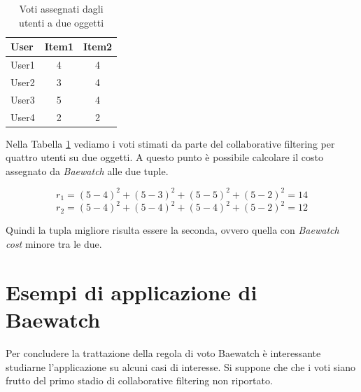 \documentclass[letterpaper]{article}
\begin{document}
\begin{table}[h]
\centering
\begin{tabular}{|l|c|c|}
\hline
\textbf{User} & \multicolumn{1}{l|}{\textbf{Item1}} & \multicolumn{1}{l|}{\textbf{Item2}} \\ \hline
User1         & 4                                   & 4                                   \\ \hline
User2         & 3                                   & 4                                   \\ \hline
User3         & 5                                   & 4                                   \\ \hline
User4         & 2                                   & 2                                   \\ \hline
\end{tabular}
\caption{Voti assegnati dagli utenti a due oggetti}
\label{table:1}
\end{table}

Nella Tabella \ref{table:1} vediamo i voti stimati da parte del collaborative filtering per quattro utenti su due oggetti. A questo punto è possibile calcolare il costo assegnato da \emph{Baewatch} alle due tuple.

\begin{equation}
    r_1 = (5 - 4)^2 + (5 - 3)^2 + (5 - 5)^2 + (5 - 2) ^2 = 14
\end{equation}
\begin{equation}
    r_2 = (5 - 4)^2 + (5 - 4)^2 + (5 - 4)^2 + (5 - 2) ^2 = 12
\end{equation}

Quindi la tupla migliore risulta essere la seconda, ovvero quella con \emph{Baewatch cost} minore tra le due.        

\section{Esempi di applicazione di Baewatch}
Per concludere la trattazione della regola di voto Baewatch è interessante studiarne l'applicazione su alcuni casi di interesse. Si suppone che che i voti siano frutto del primo stadio di collaborative filtering non riportato.
\end{document}

